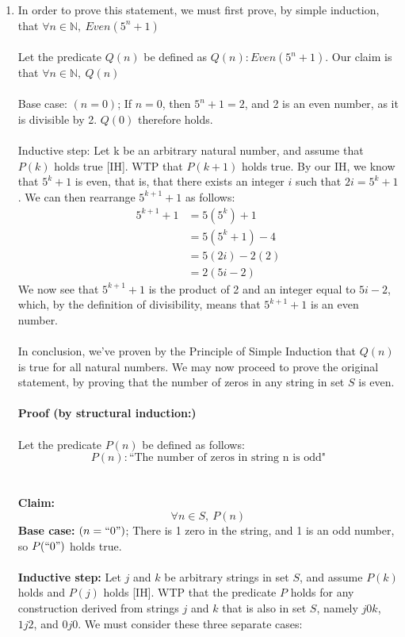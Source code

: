 \documentclass{article}
\newcommand{\N}{\mathbb{N}}
\begin{document}
\begin{enumerate}
	\item In order to prove this statement, we must first prove, by simple induction, that $\forall n \in \N,\ Even(5^n+1)$ \\\\
	Let the predicate $Q(n)$ be defined as $Q(n): Even(5^n+1)$. Our claim is that $\forall n \in \N,\ Q(n)$ \\\\
	Base case: $(n = 0)$; If $n = 0$, then $5^n+1 = 2$, and 2 is an even number, as it is divisible by 2. $Q(0)$ therefore holds. \\\\
	Inductive step: Let k be an arbitrary natural number, and assume that $P(k)$ holds true [IH]. WTP that $P(k+1)$ holds true. By our IH, we know that $5^k+1$ is even, that is, that there exists an integer $i$ such that $2i = 5^k+1$. We can then rearrange $5^{k+1}+1$ as follows:
	\begin{align*}
		5^{k+1}+1 &= 5(5^k) + 1 \\
		&= 5(5^k+1)-4 \\
		&= 5(2i)-2(2)  \\
		&= 2(5i-2)
	\end{align*} 
	We now see that $5^{k+1}+1$ is the product of 2 and an integer equal to $5i-2$, which, by the definition of divisibility, means that $5^{k+1}+1$ is an even number. \\\\
	In conclusion, we've proven by the Principle of Simple Induction that $Q(n)$ is true for all natural numbers. We may now proceed to prove the original statement, by proving that the number of zeros in any string in set $S$ is even. \\\\
	\textbf{Proof (by structural induction:)} \\\\
	Let the predicate $P(n)$ be defined as follows: $$P(n): \textrm{``The number of zeros in string n is odd"}$$ \\\\
	\textbf{Claim:} $$\forall n \in S,\ P(n)$$
	\textbf{Base case:} $(n = ``0")$; There is 1 zero in the string, and 1 is an odd number, so $P(``0")$ holds true. \\\\
	\textbf{Inductive step:} Let $j$ and $k$ be arbitrary strings in set $S$, and assume $P(k)$ holds and $P(j)$ holds [IH]. WTP that the predicate $P$ holds for any construction derived from strings $j$ and $k$ that is also in set $S$, namely $j0k$, $1j2$, and $0j0$. We must consider these three separate cases: \\\\

\end{enumerate}
\end{document}
